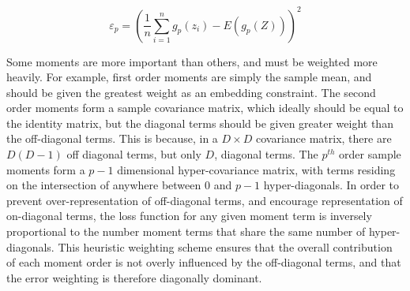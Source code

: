 \documentclass[10pt,twocolumn,letterpaper]{article}
\begin{document}
\begin{equation}
	\varepsilon_p = \left( \frac{1}{n} \sum_{i=1}^n g_p(z_i) - E(g_p(Z)) \right)^2
\end{equation}

Some moments are more important than others, and must be weighted more heavily.  
For example, first order moments are simply the sample mean, and should be given the greatest weight as an embedding constraint.  
The second order moments form a sample covariance matrix, which ideally should be equal to the identity matrix, but the diagonal terms should be given greater weight than the off-diagonal terms.  
This is because, in a $D \times D$ covariance matrix, there are $D(D-1)$ off diagonal terms, but only $D$, diagonal terms.  
The $p^{th}$ order sample moments form a $p-1$ dimensional hyper-covariance matrix, with terms residing on the intersection of anywhere between $0$ and $p-1$ hyper-diagonals.  
In order to prevent over-representation of off-diagonal terms, and encourage representation of on-diagonal terms, the loss function for any given moment term is inversely proportional to the number moment terms that share the same number of hyper-diagonals.  
This heuristic weighting scheme ensures that the overall contribution of each moment order is not overly influenced by the off-diagonal terms, and that the error weighting is therefore diagonally dominant.

%
\end{document}
